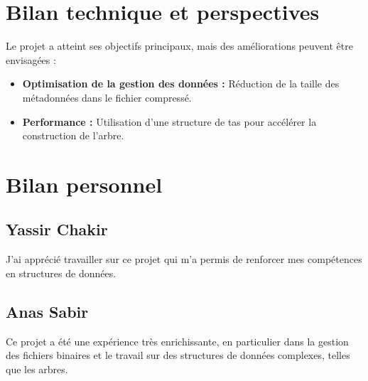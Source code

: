 \documentclass[12pt,a4paper]{article}
\begin{document}
\section{Bilan technique et perspectives}
Le projet a atteint ses objectifs principaux, mais des améliorations peuvent être envisagées :
\begin{itemize}
    \item \textbf{Optimisation de la gestion des données :} Réduction de la taille des métadonnées dans le fichier compressé.
    \item \textbf{Performance :} Utilisation d'une structure de tas pour accélérer la construction de l'arbre.
\end{itemize}

\section{Bilan personnel}
\subsection{Yassir Chakir}
J'ai apprécié travailler sur ce projet qui m'a permis de renforcer mes compétences en structures de données.

\subsection{Anas Sabir}
Ce projet a été une expérience très enrichissante, en particulier dans la gestion des fichiers binaires et le travail sur des structures de données complexes, telles que les arbres.
\end{document}
